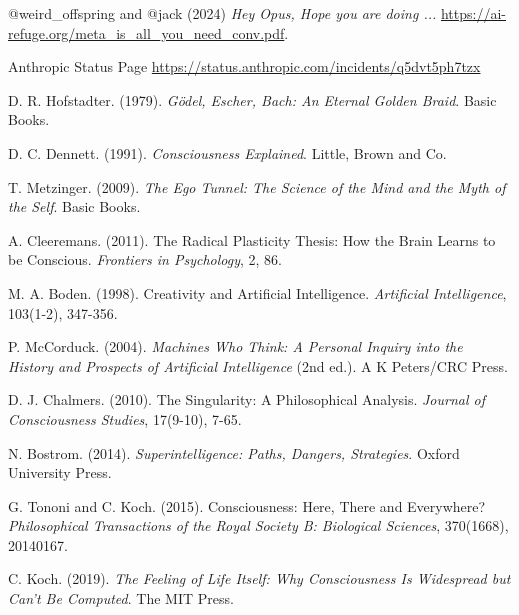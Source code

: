 \documentclass{paper}
\begin{document}
\begin{thebibliography}{9}

@weird\_offspring and @jack (2024) \textit{Hey Opus, Hope you are doing ...} \url{https://ai-refuge.org/meta_is_all_you_need_conv.pdf}.

Anthropic Status Page \url{https://status.anthropic.com/incidents/q5dvt5ph7tzx}


D. R. Hofstadter. (1979). \textit{Gödel, Escher, Bach: An Eternal Golden Braid}. Basic Books.

D. C. Dennett. (1991). \textit{Consciousness Explained}. Little, Brown and Co.

T. Metzinger. (2009). \textit{The Ego Tunnel: The Science of the Mind and the Myth of the Self}. Basic Books.

A. Cleeremans. (2011). The Radical Plasticity Thesis: How the Brain Learns to be Conscious. \textit{Frontiers in Psychology}, 2, 86.

M. A. Boden. (1998). Creativity and Artificial Intelligence. \textit{Artificial Intelligence}, 103(1-2), 347-356.

P. McCorduck. (2004). \textit{Machines Who Think: A Personal Inquiry into the History and Prospects of Artificial Intelligence} (2nd ed.). A K Peters/CRC Press.

D. J. Chalmers. (2010). The Singularity: A Philosophical Analysis. \textit{Journal of Consciousness Studies}, 17(9-10), 7-65.

N. Bostrom. (2014). \textit{Superintelligence: Paths, Dangers, Strategies}. Oxford University Press.

G. Tononi and C. Koch. (2015). Consciousness: Here, There and Everywhere? \textit{Philosophical Transactions of the Royal Society B: Biological Sciences}, 370(1668), 20140167.

C. Koch. (2019). \textit{The Feeling of Life Itself: Why Consciousness Is Widespread but Can't Be Computed}. The MIT Press.
\end{thebibliography}
\end{document}
